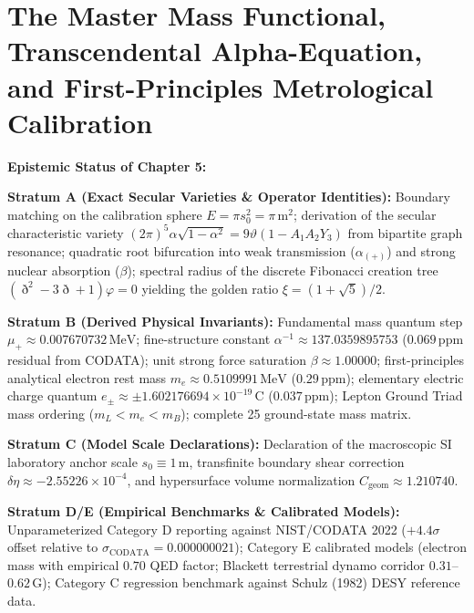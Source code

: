 \documentclass[
    12pt,
    a4paper,
    headings=normal,
    twoside=false,
    open=any,
    parskip=half
]{scrbook}
\newcommand{\ethop}{\eth}
\begin{document}
\chapter{The Master Mass Functional, Transcendental Alpha-Equation, and First-Principles Metrological Calibration}
\label{chap:ch5_expanded}

\begin{firewallbox}
\textbf{Epistemic Status of Chapter 5:}\par\smallskip\noindent
\textbf{Stratum A (Exact Secular Varieties \& Operator Identities):} Boundary matching on the calibration sphere $E = \pi s_0^2 = \pi\,\text{m}^2$; derivation of the secular characteristic variety $(2\pi)^5\alpha\sqrt{1-\alpha^2} = 9\vartheta(1 - A_1 A_2 Y_3)$ from bipartite graph resonance; quadratic root bifurcation into weak transmission ($\alpha_{(+)}$) and strong nuclear absorption ($\beta$); spectral radius of the discrete Fibonacci creation tree $(\ethop^2 - 3\ethop + 1)\varphi = 0$ yielding the golden ratio $\xi = (1+\sqrt{5})/2$.\par\smallskip\noindent
\textbf{Stratum B (Derived Physical Invariants):} Fundamental mass quantum step $\mu_+ \approx 0.007670732\,\text{MeV}$; fine-structure constant $\alpha^{-1} \approx 137.0359895753$ ($0.069\,\text{ppm}$ residual from CODATA); unit strong force saturation $\beta \approx 1.00000$; first-principles analytical electron rest mass $m_e \approx 0.5109991\,\text{MeV}$ ($0.29\,\text{ppm}$); elementary electric charge quantum $e_\pm \approx \pm 1.602176694 \times 10^{-19}\,\text{C}$ ($0.037\,\text{ppm}$); Lepton Ground Triad mass ordering ($m_L < m_e < m_B$); complete 25 ground-state mass matrix.\par\smallskip\noindent
\textbf{Stratum C (Model Scale Declarations):} Declaration of the macroscopic SI laboratory anchor scale $s_0 \equiv 1\,\text{m}$, transfinite boundary shear correction $\delta\eta \approx -2.55226 \times 10^{-4}$, and hypersurface volume normalization $C_{\text{geom}} \approx 1.210740$.\par\smallskip\noindent
\textbf{Stratum D/E (Empirical Benchmarks \& Calibrated Models):} Unparameterized Category D reporting against NIST/CODATA 2022 ($+4.4\sigma$ offset relative to $\sigma_{\text{CODATA}} = 0.000000021$); Category E calibrated models (electron mass with empirical $0.70$ QED factor; Blackett terrestrial dynamo corridor $0.31$--$0.62\,\text{G}$); Category C regression benchmark against Schulz (1982) DESY reference data.\par\smallskip\noindent

\end{firewallbox}
\end{document}
